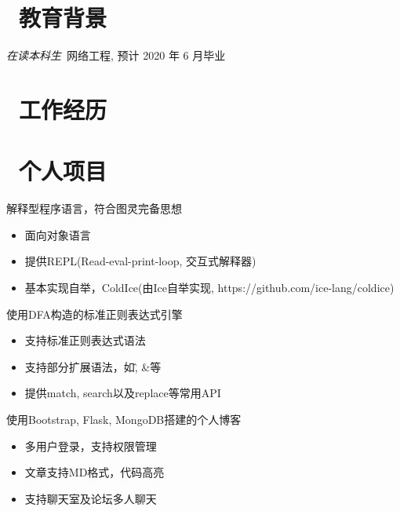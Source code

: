 \documentclass{resume}
\begin{document}


 
\section{\faGraduationCap\  教育背景}
\textit{在读本科生}\ 网络工程, 预计 2020 年 6 月毕业

\section{\faUsers\ 工作经历}
\role{实习}{深度学习实习生}

\section{\faGithubAlt\ 个人项目}
解释型程序语言，符合图灵完备思想
\begin{onehalfspacing}
\begin{itemize}
  \item 面向对象语言
  \item 提供REPL(Read-eval-print-loop, 交互式解释器)
  \item 基本实现自举，ColdIce(由Ice自举实现, https://github.com/ice-lang/coldice)
\end{itemize}
\end{onehalfspacing}

使用DFA构造的标准正则表达式引擎
\begin{onehalfspacing}
\begin{itemize}
  \item 支持标准正则表达式语法
  \item 支持部分扩展语法，如\^, \&等
  \item 提供match, search以及replace等常用API
\end{itemize}
\end{onehalfspacing}

使用Bootstrap, Flask, MongoDB搭建的个人博客
\begin{onehalfspacing}
\begin{itemize}
  \item 多用户登录，支持权限管理
  \item 文章支持MD格式，代码高亮
  \item 支持聊天室及论坛多人聊天
\end{itemize}
\end{onehalfspacing}
\end{document}
